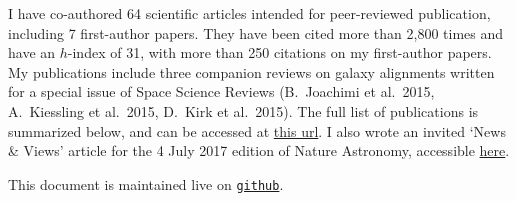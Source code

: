 I have co-authored 64 scientific articles intended for peer-reviewed publication,
including 7 first-author papers. They have been cited more than 2,800 times and
have an $h$-index of 31, with more than 250 citations on my first-author papers.
My publications include three companion reviews on galaxy alignments written for a
special issue of Space Science Reviews (B.\ Joachimi et al.\ 2015, A.\ Kiessling
et al.\ 2015, D.\ Kirk et al.\ 2015). The full list of publications is summarized
below, and can be accessed at \href{https://goo.gl/LAu9G4}{this url}. I also wrote
an invited `News \& Views' article for the 4 July 2017 edition of Nature
Astronomy, accessible
\href{https://www.nature.com/articles/s41550-017-0181}{here}.

This document is maintained live on
\href{https://github.com/cristobal-sifon/cv/blob/master/Sifon_publications.pdf}{\texttt{github}}.


